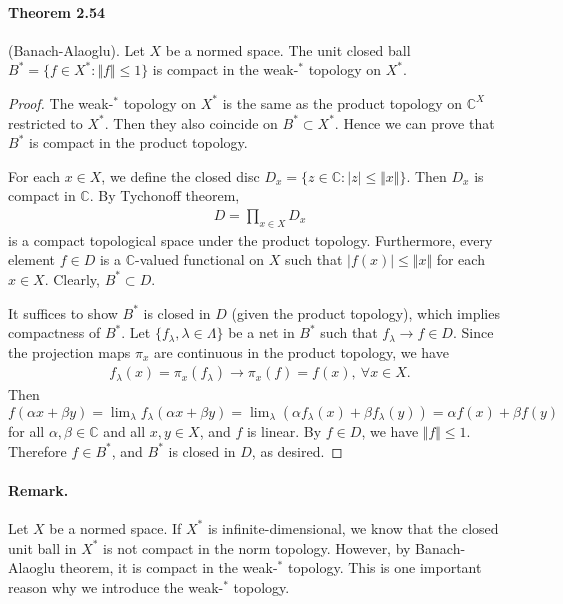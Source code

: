 \documentclass{article}
\begin{document}
\paragraph{Theorem 2.54\label{thm:2.54}} (Banach-Alaoglu). Let $X$ be a normed space. The unit closed ball $B^*=\{f\in X^*:\Vert f\Vert\leq 1\}$ is compact in the weak-$^*$ topology on $X^*$.
\begin{proof}
The weak-$^*$ topology on $X^*$ is the same as the product topology on $\mathbb{C}^X$ restricted to $X^*$. Then they also coincide on $B^*\subset X^*$.  Hence we can prove that $B^*$ is compact in the product topology.

For each $x\in X$, we define the closed disc $D_x = \{z\in\mathbb{C}:\vert z\vert\leq \Vert x\Vert\}$. Then $D_x$ is compact in $\mathbb{C}$. By Tychonoff theorem,
\begin{align*}
	D = \prod_{x\in X} D_x
\end{align*}
is a compact topological space under the product topology. Furthermore, every element $f\in D$ is a $\mathbb{C}$-valued functional on $X$ such that $\vert f(x)\vert\leq \Vert x\Vert$ for each $x\in X$. Clearly, $B^*\subset D$.

It suffices to show $B^*$ is closed in $D$ (given the product topology), which implies compactness of $B^*$. Let $\{f_\lambda,\lambda\in\Lambda\}$ be a net in $B^*$ such that $f_\lambda\to f\in D$. Since the projection maps $\pi_x$ are continuous in the product topology, we have
\begin{align*}
	f_\lambda(x) = \pi_x(f_\lambda) \to \pi_x(f) = f(x),\ \forall x\in X.
\end{align*}
Then $f(\alpha x+\beta y) = \lim_\lambda f_\lambda(\alpha x+\beta y) = \lim_\lambda (\alpha f_\lambda(x) + \beta f_\lambda(y)) = \alpha f(x) + \beta f(y)$ for all $\alpha,\beta\in\mathbb{C}$ and all $x,y\in X$, and $f$ is linear. By $f\in D$, we have $\Vert f\Vert\leq 1$. Therefore $f\in B^*$, and $B^*$ is closed in $D$, as desired.
\end{proof}

\paragraph{Remark.} Let $X$ be a normed space. If $X^*$ is infinite-dimensional, we know that the closed unit ball in $X^*$ is not compact in the norm topology. However, by Banach-Alaoglu theorem, it is compact in the weak-$^*$ topology. This is one important reason why we introduce the weak-$^*$ topology.
\end{document}
